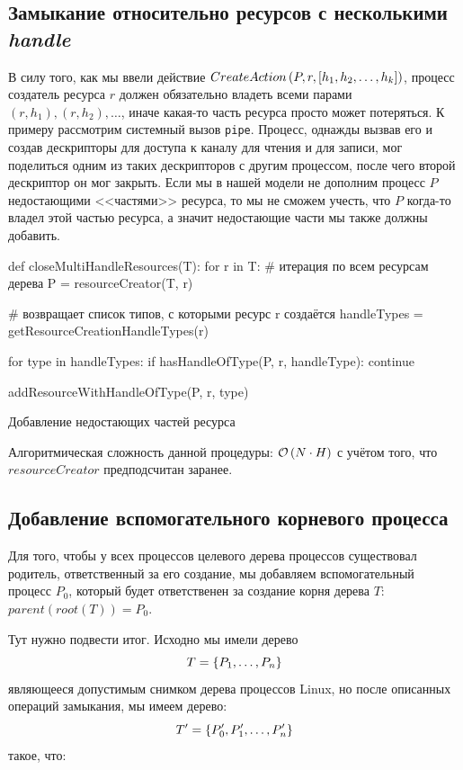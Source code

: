\subsection{Замыкание относительно ресурсов с несколькими \textit{handle}}

В силу того, как мы ввели действие $CreateAction\left( P, r, [h_1, h_2, \ldots, h_k] \right)$, процесс создатель ресурса $r$ должен обязательно владеть всеми парами $(r, h_1), (r, h_2), \ldots$, иначе какая-то часть ресурса просто может потеряться. К примеру рассмотрим системный вызов \texttt{pipe}. Процесс, однажды вызвав его и создав дескрипторы для доступа к каналу для чтения и для записи, мог поделиться одним из таких дескрипторов с другим процессом, после чего второй дескриптор он мог закрыть. Если мы в нашей модели не дополним процесс $P$ недостающими <<частями>> ресурса, то мы не сможем учесть, что $P$ когда-то владел этой частью ресурса, а значит недостающие части мы также должны добавить.

\begin{listing}[ht!]
\begin{pythoncode}
def closeMultiHandleResources(T):
    for r in T: # итерация по всем ресурсам дерева
        P = resourceCreator(T, r)

        # возвращает список типов, с которыми ресурс r создаётся
        handleTypes = getResourceCreationHandleTypes(r)

        for type in handleTypes:
            if hasHandleOfType(P, r, handleType):
                continue

            addResourceWithHandleOfType(P, r, type)
\end{pythoncode}
\caption{Добавление недостающих частей ресурса}
\label{code:closemultihandle}
\end{listing}

Алгоритмическая сложность данной процедуры: $\mathcal{O}\left(N \cdot H\right)$ с учётом того, что $resourceCreator$ предподсчитан заранее.

\subsection{Добавление вспомогательного корневого процесса}

Для того, чтобы у всех процессов целевого дерева процессов существовал родитель, ответственный за его создание, мы добавляем вспомогательный процесс $P_0$, который будет ответственен за создание корня дерева $T$: $parent(root(T)) = P_0$.

Тут нужно подвести итог. Исходно мы имели дерево 
\begin{equation*}
T = \left\lbrace P_1, \ldots, P_n \right\rbrace
\end{equation*} 
являющееся допустимым снимком дерева процессов Linux, но после описанных операций замыкания, мы имеем дерево:
\begin{equation*}
T' = \left\lbrace P_0', P_1', \ldots, P_n' \right\rbrace
\end{equation*}
такое, что:

